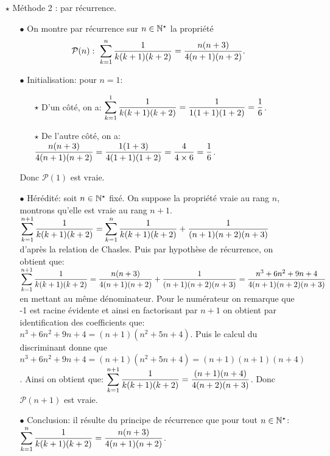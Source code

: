 \documentclass[a4paper, 11pt,reqno]{article}
\begin{document}
\begin{correction}
\begin{enumerate}
\begin{itemize}
\item[$\star$] M\'ethode 2 : par r\'ecurrence.
\begin{itemize}
\item[$\bullet$] On montre par r\'ecurrence sur $n\in\mathbb{N}^{\star}$ la propri\'et\'e 
$$\mathcal{P}(n):\  \displaystyle \sum\limits_{k=1}^{n} \displaystyle\frac{1}{k(k+1)(k+2)}=\displaystyle\frac{n(n+3)}{4(n+1)(n+2)} .$$
\item[$\bullet$] Initialisation: pour $n=1$:
\begin{itemize}
\item[$\star$] D'un c\^{o}t\'e, on a: $\displaystyle \sum\limits_{k=1}^{1} \displaystyle\frac{1}{k(k+1)(k+2)}=\displaystyle\frac{1}{1(1+1)(1+2)}=\displaystyle\frac{1}{6}$.
\item[$\star$] De l'autre c\^{o}t\'e, on a: $\displaystyle\frac{n(n+3)}{4(n+1)(n+2)}=\displaystyle\frac{1(1+3)}{4(1+1)(1+2)}=\displaystyle\frac{4}{4\times 6}=\displaystyle\frac{1}{6}$.
\end{itemize}
Donc $\mathcal{P}(1)$ est vraie.
\item[$\bullet$] H\'er\'edit\'e: soit $n\in\mathbb{N}^{\star}$ fix\'e. On suppose la propri\'et\'e vraie au rang $n$, montrons qu'elle est vraie au rang $n+1$.\\
\noindent $\displaystyle \sum\limits_{k=1}^{n+1} \displaystyle\frac{1}{k(k+1)(k+2)}=\displaystyle \sum\limits_{k=1}^{n} \displaystyle\frac{1}{k(k+1)(k+2)}+\displaystyle\frac{1}{(n+1)(n+2)(n+3)}$ d'apr\`{e}s la relation de Chasles. Puis par hypoth\`{e}se de r\'ecurrence, on obtient que:
$\displaystyle \sum\limits_{k=1}^{n+1} \displaystyle\frac{1}{k(k+1)(k+2)}=\displaystyle\frac{n(n+3)}{4(n+1)(n+2)} +\displaystyle\frac{1}{(n+1)(n+2)(n+3)}=
\displaystyle\frac{n^3+6n^2+9n+4}{4(n+1)(n+2)(n+3)}$ en mettant au m\^{e}me d\'enominateur. Pour le num\'erateur on remarque que -1 est racine \'evidente et ainsi en factorisant par $n+1$ on obtient par identification des coefficients que: 
$n^3+6n^2+9n+4=(n+1)(n^2+5n+4)$. Puis le calcul du discriminant donne que $n^3+6n^2+9n+4=(n+1)(n^2+5n+4)=(n+1)(n+1)(n+4)$. Ainsi on obtient que: $\displaystyle \sum\limits_{k=1}^{n+1} \displaystyle\frac{1}{k(k+1)(k+2)}=\displaystyle\frac{(n+1)(n+4)}{4(n+2)(n+3)}$. Donc $\mathcal{P}(n+1)$ est vraie.  
\item[$\bullet$] Conclusion: il r\'esulte du principe de r\'ecurrence que pour tout $n\in\mathbb{N}^{\star}$: $\displaystyle \sum\limits_{k=1}^{n} \displaystyle\frac{1}{k(k+1)(k+2)}=\displaystyle\frac{n(n+3)}{4(n+1)(n+2)}$.
\end{itemize}
\end{itemize}
\end{enumerate}
\end{correction}
\end{document}
